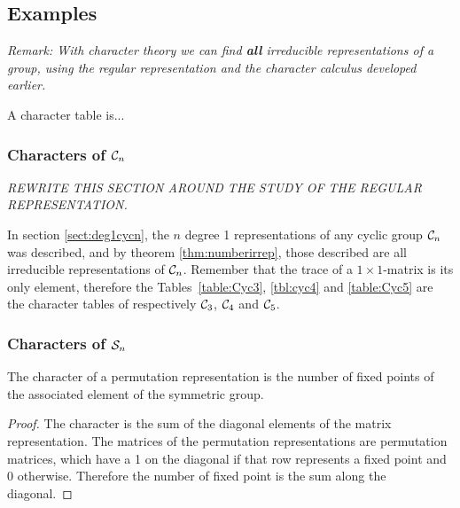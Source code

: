 \subsection{Examples}

\textit{Remark: With character theory we can find \textbf{all} irreducible representations of a group, using the regular representation and the character calculus developed earlier.}

\begin{definition}
	A character table is...
\end{definition}



\subsubsection{Characters of $\mathcal{C}_n$}

\textit{REWRITE THIS SECTION AROUND THE STUDY OF THE REGULAR REPRESENTATION.}

\begin{example}
	In section \ref{sect:deg1cycn}, the $n$ degree 1 representations of any cyclic group $\mathcal{C}_n$ was described, and by theorem \ref{thm:numberirrep}, those described are all irreducible representations of $\mathcal{C}_n$. Remember that the trace of a $1 \times 1$-matrix is its only element, therefore the Tables~\ref{table:Cyc3}, \ref{tbl:cyc4} and \ref{table:Cyc5} are the character tables of respectively $\mathcal{C}_3$, $\mathcal{C}_4$ and $\mathcal{C}_5$.
\end{example}

\subsubsection{Characters of $\mathcal{S}_n$}

\begin{theorem}
	The character of a permutation representation is the number of fixed points of the associated element of the symmetric group.
\end{theorem}
\begin{proof}
	The character is the sum of the diagonal elements of the matrix representation. The matrices of the permutation representations are permutation matrices, which have a 1 on the diagonal if that row represents a fixed point and 0 otherwise. Therefore the number of fixed point is the sum along the diagonal.
\end{proof}


